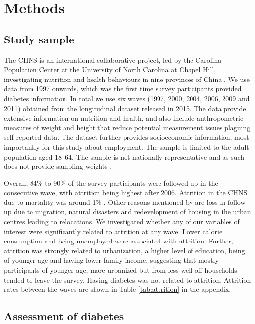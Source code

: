 \section{\label{sec:Methods5}Methods}

\subsection{Study sample}


The \acf{CHNS} is an international collaborative project, led by the Carolina Population Center at the University of North Carolina at Chapel Hill, investigating nutrition and health behaviours in nine provinces of China \parencite{Zhang2014d}. We use data from 1997 onwards, which was the first time survey participants provided diabetes information. In total we use six waves (1997, 2000, 2004, 2006, 2009 and 2011) obtained from the longitudinal dataset released in 2015. The data provide extensive information on nutrition and health, and also include anthropometric measures of weight and height that reduce potential measurement issues plaguing self-reported data. The dataset further provides socioeconomic information, most importantly for this study about employment. The sample is limited to the adult population aged 18--64.  The sample is not nationally representative and as such does not provide sampling weights  \parencite{Popkin2010}.

Overall, 84\% to 90\% of the survey participants were followed up in the consecutive wave, with attrition being highest after 2006. Attrition in the \ac{CHNS} due to mortality was around 1\% \parencite{Popkin2010}. Other reasons mentioned by \textcite{Popkin2010} are loss in follow up due to migration, natural disasters and redevelopment of housing in the urban centres leading to relocations. We investigated whether any of our variables of interest were significantly related to attrition at any wave. Lower calorie consumption and being unemployed were associated with attrition. Further, attrition was strongly related to urbanization, a higher level of education, being of younger age and having lower family income, suggesting that mostly participants of younger age, more urbanized but from less well-off households tended to leave the survey. Having diabetes was not related to attrition. Attrition rates between the waves are shown in Table \ref{tab:attrition} in the appendix.


\subsection{Assessment of diabetes}

